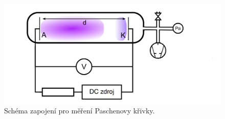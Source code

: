 \documentclass[a4paper,12pt]{article}
\begin{document}
%

\begin{figure}[h!]
	\centering
	\includegraphics[width=145mm]{schema1op.png}
	\caption{Schéma zapojení pro měření Paschenovy křivky.}
	\label{schema1}
\end{figure}
\end{document}
